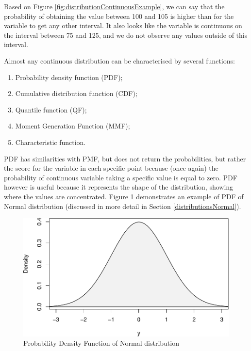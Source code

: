 \documentclass[
]{book}
\providecommand{\tightlist}{%
  \setlength{\itemsep}{0pt}\setlength{\parskip}{0pt}}
\theoremstyle{definition}
\theoremstyle{definition}
\theoremstyle{definition}
\theoremstyle{definition}
\theoremstyle{remark}
\begin{document}
Based on Figure \ref{fig:distributionContinuousExample}, we can say that the probability of obtaining the value between 100 and 105 is higher than for the variable to get any other interval. It also looks like the variable is continuous on the interval between 75 and 125, and we do not observe any values outside of this interval.

Almost any continuous distribution can be characterised by several functions:

\begin{enumerate}
\def\labelenumi{\arabic{enumi}.}
\tightlist
\item
  Probability density function (PDF);
\item
  Cumulative distribution function (CDF);
\item
  Quantile function (QF);
\item
  Moment Generation Function (MMF);
\item
  Characteristic function.
\end{enumerate}

PDF has similarities with PMF, but does not return the probabilities, but rather the score for the variable in each specific point because (once again) the probability of continuous variable taking a specific value is equal to zero. PDF however is useful because it represents the shape of the distribution, showing where the values are concentrated. Figure \ref{fig:dnormPlotIntro} demonstrates an example of PDF of Normal distribution (discussed in more detail in Section \ref{distributionsNormal}).

\begin{figure}
\centering
\includegraphics{Svetunkov---Statistics-for-Business-Analytics_files/figure-latex/dnormPlotIntro-1.pdf}
\caption{\label{fig:dnormPlotIntro}Probability Density Function of Normal distribution}
\end{figure}
\end{document}
